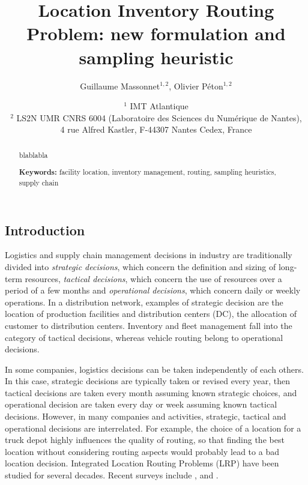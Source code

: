 \documentclass[a4paper,10pt]{article}
\title{Location Inventory Routing Problem: new formulation and sampling heuristic}
\author{Guillaume Massonnet$^{1,2}$, Olivier P\'eton$^{1,2}$}
\date{$^1$ IMT Atlantique\\ 
	$^2$ LS2N UMR CNRS 6004 (Laboratoire des Sciences du Numérique de Nantes), \\ 4 rue Alfred Kastler, F-44307 Nantes Cedex, France}
\begin{document}
	
\maketitle

\begin{abstract}
	blablabla
	
	
\textbf{Keywords:}	facility location, inventory management, routing, sampling heuristics, supply chain
	
\end{abstract}



\modulolinenumbers[5]
\linenumbers
\begin{linenumbers}


\section{Introduction}


Logistics and supply chain management decisions in industry are traditionally divided into 
\textit{strategic decisions}, which concern the definition and sizing of long-term resources, 
\textit{tactical decisions}, which concern the use of resources over a period of a few months and 
\textit{operational decisions}, which concern daily or weekly operations. 
In a distribution network, examples of strategic decision are the location of production facilities and distribution centers (DC), the allocation of customer to distribution centers. 
Inventory and fleet management fall into the category of tactical decisions,
 whereas vehicle routing belong to operational decisions. 

In some companies, logistics decisions can be taken independently of each others. 
In this case, strategic decisions are typically taken or revised every year, then tactical decisions are taken every month assuming known strategic choices, and operational decision are taken every day or week assuming known tactical decisions. 
However, in many companies and activities, strategic, tactical and operational decisions are interrelated. 
For example, the choice of a location for a truck depot highly influences the quality of routing, so that finding the best location without considering routing aspects would probably lead to a bad location decision.  Integrated Location Routing Problems (LRP) have been studied for several decades. Recent surveys include \cite{ProdhonPrins2014}, \cite{DrexlSchneider2015} and \cite{Schneider2017}.  
  


\end{linenumbers}
\end{document}
